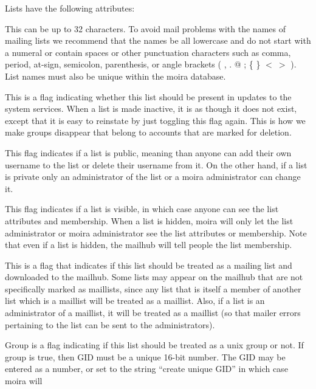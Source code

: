 Lists have the following attributes:
\begin{description}
\item[name] This can be up to 32 characters.  To avoid mail
problems with the names of mailing lists we recommend that the names
be all lowercase and do not start with a numeral or contain spaces or
other punctuation characters such as comma, period, at-sign, semicolon,
parenthesis, or angle brackets ( , . @ ; \{ \} $<\ >$ ).  List names must
also be unique within the moira database.
\item[active/inactive] This is a flag indicating whether this list should be
present in updates to the system services.  When a list is made
inactive, it is as though it does not exist, except that it is easy to
reinstate by just toggling this flag again.  This is how we make
groups disappear that belong to accounts that are marked for deletion.
\item[public/private] This flag indicates if a list is public, meaning than
anyone can add their own username to the list or delete their username
from it.  On the other hand, if a list is private only an
administrator of the list or a moira administrator can change it.
\item[visible/hidden] This flag indicates if a list is visible, in which
case anyone can see the list attributes and membership.  When a list
is hidden, moira will only let the list administrator or moira
administrator see the list attributes or membership.  Note that even
if a list is hidden, the mailhub will tell people the list membership.
\item[maillist] This is a flag that indicates if this list should be treated
as a mailing list and downloaded to the mailhub.  Some lists may
appear on the mailhub that are not specifically marked as maillists,
since any list that is itself a member of another list which is a
maillist will be treated as a maillist.  Also, if a list is an
administrator of a maillist, it will be treated as a maillist (so that
mailer errors pertaining to the list can be sent to the administrators).
\item[group and GID] Group is a flag indicating if this list should be
treated as a {\sc unix} group or not.  If group is true, then GID must
be a unique 16-bit number.  The GID may be entered as a number, or
set to the string ``create unique GID'' in which case moira will

\end{description}
